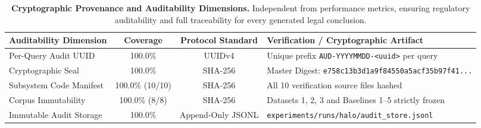 \vspace{1em}

\begin{table}[h]
\centering
\small
\begin{tabular}{lccl}
\toprule
\textbf{Auditability Dimension} & \textbf{Coverage} & \textbf{Protocol Standard} & \textbf{Verification / Cryptographic Artifact} \\
\midrule
Per-Query Audit UUID & 100.0\% & UUIDv4 & Unique prefix \texttt{AUD-YYYYMMDD-<uuid>} per query \\
Cryptographic Seal & 100.0\% & SHA-256 & Master Digest: \texttt{e758c13b3d1a9f84550a5acf35b97f41...} \\
Subsystem Code Manifest & 100.0\% (10/10) & SHA-256 & All 10 verification source files hashed \\
Corpus Immutability & 100.0\% (8/8) & SHA-256 & Datasets 1, 2, 3 and Baselines 1--5 strictly frozen \\
Immutable Audit Storage & 100.0\% & Append-Only JSONL & \texttt{experiments/runs/halo/audit\_store.jsonl} \\
\bottomrule
\end{tabular}
\caption{\textbf{Cryptographic Provenance and Auditability Dimensions.} Independent from performance metrics, ensuring regulatory auditability and full traceability for every generated legal conclusion.}
\label{tab:auditability_dimensions}
\end{table}




